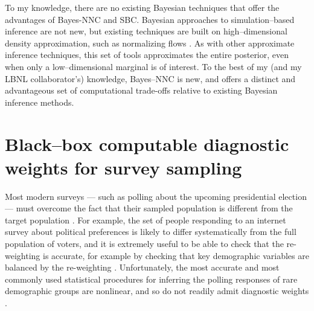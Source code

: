 To my knowledge, there are no existing Bayesian techniques that offer the
advantages of Bayes-NNC and SBC.  Bayesian approaches to simulation--based
inference are not new, but existing techniques are built on high--dimensional
density approximation, such as normalizing flows
\citep{cranmer:2020:frontierofsimulation,papamakarios:2021:normalizing}.  As
with other approximate inference techniques, this set of tools approximates the
entire posterior, even when only a low--dimensional marginal is of interest.  To
the best of my (and my LBNL collaborator's) knowledge, Bayes--NNC is new, and
offers a distinct and advantageous set of computational trade-offs relative to
existing Bayesian inference methods.  




\section*{Black--box computable diagnostic weights for survey sampling}

Most modern surveys --- such as polling about the upcoming presidential election
--- must overcome the fact that their sampled population is different from the
target population \citep{gelman:2007:surveystruggles}.  For example, the set of
people responding to an internet survey about political preferences is likely to
differ systematically from the full population of voters, and it is extremely
useful to be able to check that the re-weighting is accurate, for example by
checking that key demographic variables are balanced by the re-weighting
\citep{li:2018:balancingcovariates,benmichael:2021:multilevel}. Unfortunately,
the most accurate and most commonly used statistical procedures for inferring
the polling responses of rare demographic groups are nonlinear, and so do not
readily admit diagnostic weights
\citep{gelman:1997:poststratification,gelman:2007:surveystruggles}. 

